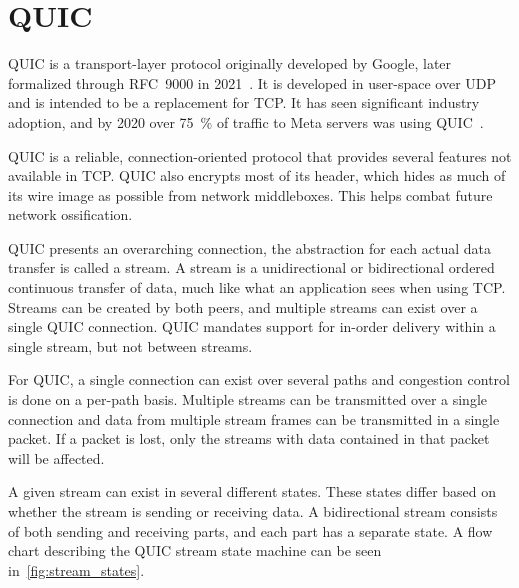 \section{QUIC}\label{sec:quic}
QUIC is a transport-layer protocol originally developed by Google, later formalized
through RFC~9000 in 2021~\cite{rfc9000}. It is developed in user-space over UDP
and is intended to be a replacement for TCP. It has seen significant industry adoption,
and by 2020 over \qty{75}{\percent} of traffic to Meta servers was using
QUIC~\cite{joras2020quic}.

QUIC is a reliable, connection-oriented protocol that provides several
features not available
in TCP. QUIC also encrypts most of its header, which
hides as much of its wire image as possible
from network middleboxes. This helps combat
future network ossification.

QUIC presents an overarching connection, the
abstraction for each actual data transfer is called a stream.
A stream is a unidirectional or bidirectional ordered
continuous transfer of data, much like what an application sees when using
TCP. Streams can be created by both peers,
and multiple streams can exist over a single QUIC connection.
QUIC mandates support for in-order delivery within a single
stream, but not between streams.

For QUIC, a single connection can exist over several paths and
congestion control is done on a per-path basis. Multiple streams
can be transmitted over a single connection and data from
multiple stream frames can be transmitted in a single packet.
If a packet is lost, only the streams with data contained
in that packet will be affected.

A given stream can exist in several different states.
These states differ based on whether the stream is sending or receiving
data. A bidirectional stream consists of both sending and receiving parts,
and each part has a separate state.
A flow chart describing the QUIC stream state machine can be
seen in~\cref{fig:stream_states}.

